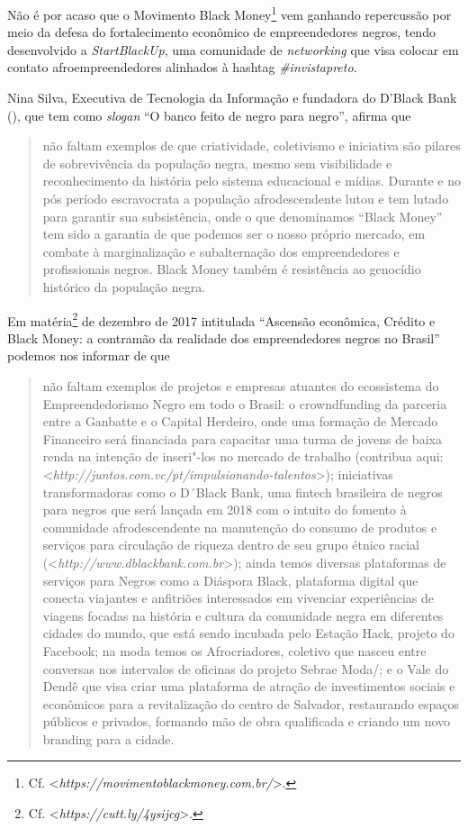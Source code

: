Não é por acaso que o Movimento Black Money\footnote{Cf.
  \textless{}\emph{https://movimentoblackmoney.com.br/}\textgreater{}.} vem ganhando repercussão
por meio da defesa do fortalecimento econômico de empreendedores negros,
tendo desenvolvido a \emph{StartBlackUp}, uma comunidade de
\emph{networking} que visa colocar em contato afroempreendedores
alinhados à hashtag \emph{\#invistapreto}.

Nina Silva, Executiva de Tecnologia da Informação e fundadora do D'Black
Bank (), que tem como \emph{slogan} ``O banco feito de negro para
negro'', afirma que

\begin{quote}
não faltam exemplos de que criatividade, coletivismo e iniciativa são
pilares de sobrevivência da população negra, mesmo sem visibilidade e
reconhecimento da história pelo sistema educacional e mídias. Durante e
no pós período escravocrata a população afrodescendente lutou e tem
lutado para garantir sua subsistência, onde o que denominamos ``Black
Money'' tem sido a garantia de que podemos ser o nosso próprio mercado,
em combate à marginalização e subalternação dos empreendedores e
profissionais negros. Black Money também é resistência ao genocídio
histórico da população negra.
\end{quote}

Em matéria\footnote{Cf.
  \textless{}\emph{https://cutt.ly/4ysijcg}\textgreater{}.}
de dezembro de 2017 intitulada ``Ascensão econômica, Crédito e Black
Money: a contramão da realidade dos empreendedores negros no Brasil''
podemos nos informar de que

\begin{quote}
não faltam exemplos de projetos e empresas atuantes do ecossistema do
Empreendedorismo Negro em todo o Brasil: o crowndfunding da parceria
entre a Ganbatte e o Capital Herdeiro, onde uma formação de Mercado
Financeiro será financiada para capacitar uma turma de jovens de baixa
renda na intenção de inseri"-los no mercado de trabalho (contribua aqui:
\textless{}\emph{http://juntos.com.vc/pt/impulsionando-talentos}\textgreater{}); iniciativas
transformadoras como o D´Black Bank, uma fintech brasileira de negros
para negros que será lançada em 2018 com o intuito do fomento à
comunidade afrodescendente na manutenção do consumo de produtos e
serviços para circulação de riqueza dentro de seu grupo étnico racial
(\textless{}\emph{http://www.dblackbank.com.br}\textgreater{}); ainda temos diversas plataformas
de serviços para Negros como a Diáspora Black, plataforma digital que
conecta viajantes e anfitriões interessados em vivenciar experiências de
viagens focadas na história e cultura da comunidade negra em diferentes
cidades do mundo, que está sendo incubada pelo Estação Hack, projeto do
Facebook; na moda temos os Afrocriadores, coletivo que nasceu entre
conversas nos intervalos de oficinas do projeto Sebrae Moda/; e o Vale
do Dendê que visa criar uma plataforma de atração de investimentos
sociais e econômicos para a revitalização do centro de Salvador,
restaurando espaços públicos e privados, formando mão de obra
qualificada e criando um novo branding para a cidade.
\end{quote}

